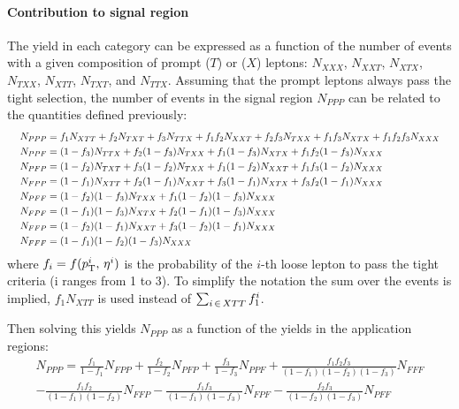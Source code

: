 \paragraph{Contribution to signal region\\}
The yield in each category can be expressed as a function of the number of events
with a given composition of prompt ($T$) or \nonprompt ($X$) leptons:
$N_{XXX}$, $N_{XXT}$, $N_{XTX}$, $N_{TXX}$, $N_{XTT}$, $N_{TXT}$, and $N_{TTX}$.
Assuming that the prompt leptons always pass the tight selection,
the number of \nonprompt events in the signal region $N_{PPP}$ can be related to the quantities defined previously:
\begin{equation}
  \resizebox{\textwidth}{!}{
    $\begin{aligned}
      N_{PPP} &= f_1 N_{XTT} + f_2 N_{TXT}+f_3 N_{TTX}+f_1 f_2 N_{XXT}+f_2 f_3 N_{TXX}+f_1 f_3 N_{XTX}+f_1 f_2 f_3 N_{XXX}\\
      N_{PPF} &= (1-f_3) N_{TTX} + f_2(1-f_3) N_{TXX} + f_1(1-f_3) N_{XTX} + f_1 f_2(1-f_3) N_{XXX}\\
      N_{PFP} &= (1-f_2) N_{TXT} + f_3(1-f_2) N_{TXX} + f_1(1-f_2) N_{XXT} + f_1 f_3(1-f_2) N_{XXX}\\
      N_{FPP} &= (1-f_1) N_{XTT} + f_2(1-f_1) N_{XXT} + f_3(1-f_1) N_{XTX} + f_3 f_2(1-f_1) N_{XXX}\\
      N_{PFF} &= (1-f_2)(1-f_3) N_{TXX} + f_1(1-f_2)(1-f_3) N_{XXX}\\
      N_{FPF} &= (1-f_1)(1-f_3) N_{XTX} + f_2(1-f_1)(1-f_3) N_{XXX}\\
      N_{FFP} &= (1-f_2)(1-f_1) N_{XXT} + f_3(1-f_2)(1-f_1) N_{XXX}\\
      N_{FFF} &= (1-f_1)(1-f_2)(1-f_3) N_{XXX}
    \end{aligned}$
  }
\end{equation}
where $f_i = f(p_{\mathrm{T}}^{i},\, \eta^{i})$ is the probability of the $i$-th loose \nonprompt lepton to pass the tight criteria (i ranges from 1 to 3).
To simplify the notation the sum over the events is implied,
\eg $f_1 N_{XTT}$ is used instead of $\sum_{i\,\in\, XTT}f_1^i$.

Then solving this yields $N_{PPP}$ as a function of the yields in the application regions:
\begin{equation}
\begin{split}
N_{PPP} =
  \frac{f_1}{1-f_1} N_{FPP}
+ \frac{f_2}{1-f_2} N_{PFP}
+ \frac{f_3}{1-f_3} N_{PPF}
+ \frac{f_1 f_2 f_3}{(1-f_1)(1-f_2)(1-f_3)} N_{FFF}\\
- \frac{f_1 f_2}{(1-f_1)(1-f_2)} N_{FFP}
- \frac{f_1 f_3}{(1-f_1)(1-f_3)} N_{FPF}
- \frac{f_2 f_3}{(1-f_2)(1-f_3)} N_{PFF}
\end{split}
\end{equation}
